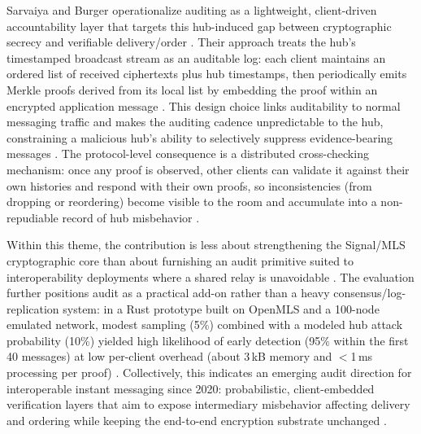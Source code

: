 Sarvaiya and Burger operationalize auditing as a lightweight, client-driven accountability layer that targets this hub-induced gap between cryptographic secrecy and verifiable delivery/order \cite{sarvaiya2025}. Their approach treats the hub’s timestamped broadcast stream as an auditable log: each client maintains an ordered list of received ciphertexts plus hub timestamps, then periodically emits Merkle proofs derived from its local list by embedding the proof within an encrypted application message \cite{sarvaiya2025}. This design choice links auditability to normal messaging traffic and makes the auditing cadence unpredictable to the hub, constraining a malicious hub’s ability to selectively suppress evidence-bearing messages \cite{sarvaiya2025}. The protocol-level consequence is a distributed cross-checking mechanism: once any proof is observed, other clients can validate it against their own histories and respond with their own proofs, so inconsistencies (from dropping or reordering) become visible to the room and accumulate into a non-repudiable record of hub misbehavior \cite{sarvaiya2025}. 

Within this theme, the contribution is less about strengthening the Signal/MLS cryptographic core than about furnishing an audit primitive suited to interoperability deployments where a shared relay is unavoidable \cite{sarvaiya2025}. The evaluation further positions audit as a practical add-on rather than a heavy consensus/log-replication system: in a Rust prototype built on OpenMLS and a 100-node emulated network, modest sampling (5\%) combined with a modeled hub attack probability (10\%) yielded high likelihood of early detection (95\% within the first 40 messages) at low per-client overhead (about 3\,kB memory and $<$1\,ms processing per proof) \cite{sarvaiya2025}. Collectively, this indicates an emerging audit direction for interoperable instant messaging since 2020: probabilistic, client-embedded verification layers that aim to expose intermediary misbehavior affecting delivery and ordering while keeping the end-to-end encryption substrate unchanged \cite{sarvaiya2025}.

